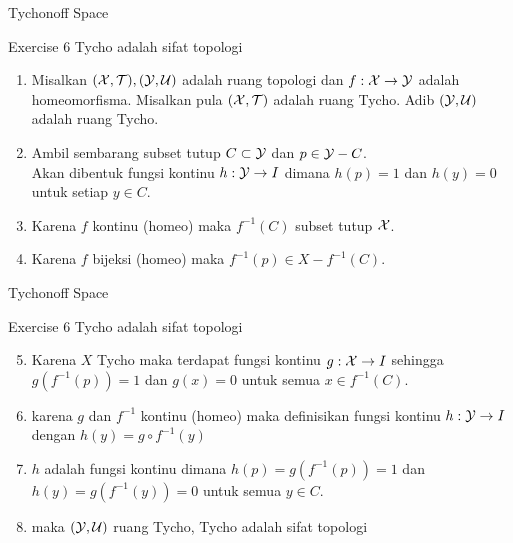 \begin{frame}{Tychonoff Space}
    \begin{block}{Exercise 6}
        Tycho adalah sifat topologi
        \begin{enumerate}
            \item Misalkan $(\mathcal{X},\mathcal{T}), (\mathcal{Y},\mathcal{U})$ adalah ruang topologi
            dan $f: \mathcal{X}\to\mathcal{Y}$ adalah homeomorfisma. Misalkan pula $(\mathcal{X},\mathcal{T})$ 
            adalah ruang Tycho. Adib $(\mathcal{Y},\mathcal{U})$ adalah ruang Tycho.
            \item Ambil sembarang subset tutup $C\subset \mathcal{Y}$ dan $p\in\mathcal{Y}-C$.\\
            Akan dibentuk fungsi kontinu $h:\mathcal{Y} \to I$ dimana $h(p)=1$ dan $h(y)=0$ untuk setiap $y\in C$.
            \item Karena $f$ kontinu (homeo) maka $f^{-1}(C)$ subset tutup $\mathcal{X}$.
            \item Karena $f$ bijeksi (homeo) maka $f^{-1}(p)\in X-f^{-1}(C)$.
        \end{enumerate}
    \end{block}
\end{frame}

\begin{frame}{Tychonoff Space}
    \begin{block}{Exercise 6}
        Tycho adalah sifat topologi
        \begin{enumerate}\setcounter{enumi}{4}
            \item Karena $X$ Tycho maka terdapat fungsi kontinu $g:\mathcal{X}\to I$ sehingga
            $g(f^{-1}(p))=1$ dan $g(x)=0$ untuk semua $x\in f^{-1}(C)$.
            \item karena $g$ dan $f^{-1}$ kontinu (homeo) maka definisikan fungsi kontinu
             $h:\mathcal{Y} \to I$ dengan $h(y)=g\circ f^{-1}(y)$
            \item $h$ adalah fungsi kontinu dimana $h(p) = g(f^{-1}(p))=1$ dan $h(y)=g(f^{-1}(y))=0$ untuk semua $y\in C$.        
            \item maka $(\mathcal{Y},\mathcal{U})$ ruang Tycho, Tycho adalah sifat topologi
        \end{enumerate}      
    \end{block}
\end{frame}

